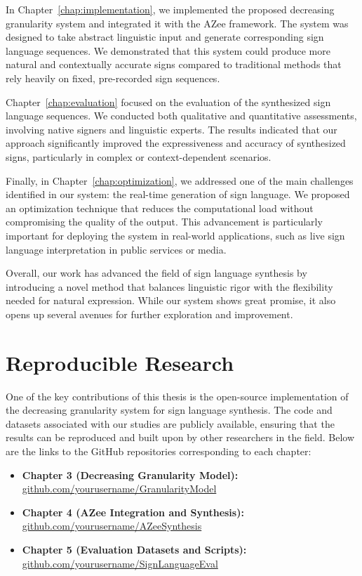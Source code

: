 \documentclass[../../main.tex]{subfiles}
\begin{document}
In Chapter~\ref{chap:implementation}, we implemented the proposed decreasing granularity system and integrated it with the AZee framework. The system was designed to take abstract linguistic input and generate corresponding sign language sequences. We demonstrated that this system could produce more natural and contextually accurate signs compared to traditional methods that rely heavily on fixed, pre-recorded sign sequences.

Chapter~\ref{chap:evaluation} focused on the evaluation of the synthesized sign language sequences. We conducted both qualitative and quantitative assessments, involving native signers and linguistic experts. The results indicated that our approach significantly improved the expressiveness and accuracy of synthesized signs, particularly in complex or context-dependent scenarios.

Finally, in Chapter~\ref{chap:optimization}, we addressed one of the main challenges identified in our system: the real-time generation of sign language. We proposed an optimization technique that reduces the computational load without compromising the quality of the output. This advancement is particularly important for deploying the system in real-world applications, such as live sign language interpretation in public services or media.

Overall, our work has advanced the field of sign language synthesis by introducing a novel method that balances linguistic rigor with the flexibility needed for natural expression. While our system shows great promise, it also opens up several avenues for further exploration and improvement.

\section{Reproducible Research}
\label{ch:conclusion:opensource}

One of the key contributions of this thesis is the open-source implementation of the decreasing granularity system for sign language synthesis. The code and datasets associated with our studies are publicly available, ensuring that the results can be reproduced and built upon by other researchers in the field. Below are the links to the GitHub repositories corresponding to each chapter:

\begin{itemize}
    \item \textbf{Chapter 3 (Decreasing Granularity Model):}
    \url{github.com/yourusername/GranularityModel}
    
    \item \textbf{Chapter 4 (AZee Integration and Synthesis):}
    \url{github.com/yourusername/AZeeSynthesis}
    
    \item \textbf{Chapter 5 (Evaluation Datasets and Scripts):}
    \url{github.com/yourusername/SignLanguageEval}
\end{itemize}
\end{document}
